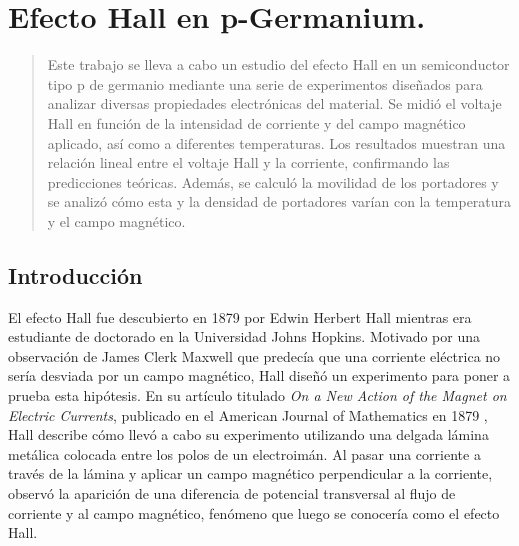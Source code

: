 



	

	
	
	\let\cleardoublepage\clearpage
	
	\frontmatter
	\tableofcontents
      
      

	
	\mainmatter
	\titleformat{\chapter}[display]
	{\normalfont\bfseries}{}{0pt}{\LARGE}
	\chapter{Efecto Hall en p-Germanium.}
	\begin{abstract}
	\footnotesize
	\vspace{\baselineskip}
	Este trabajo se lleva a cabo un estudio del efecto Hall en un semiconductor tipo p de germanio mediante una serie de experimentos diseñados para analizar diversas propiedades electrónicas del material. Se midió el voltaje Hall en función de la intensidad de corriente y del campo magnético aplicado, así como a diferentes temperaturas. Los resultados muestran una relación lineal entre el voltaje Hall y la corriente, confirmando las predicciones teóricas. Además, se calculó la movilidad de los portadores y se analizó cómo esta y la densidad de portadores varían con la temperatura y el campo magnético.
	


	\end{abstract}
	\section{Introducción}
	
	\vspace{\baselineskip}
	
	El efecto Hall fue descubierto en 1879 por Edwin Herbert Hall mientras era estudiante de doctorado en la Universidad Johns Hopkins. Motivado por una observación de James Clerk Maxwell que predecía que una corriente eléctrica no sería desviada por un campo magnético, Hall diseñó un experimento para poner a prueba esta hipótesis. En su artículo titulado \emph{On a New Action of the Magnet on Electric Currents}, publicado en el American Journal of Mathematics en 1879 \cite{hall}, Hall describe cómo llevó a cabo su experimento utilizando una delgada lámina metálica colocada entre los polos de un electroimán. Al pasar una corriente a través de la lámina y aplicar un campo magnético perpendicular a la corriente, observó la aparición de una diferencia de potencial transversal al flujo de corriente y al campo magnético, fenómeno que luego se conocería como el efecto Hall​.
	
